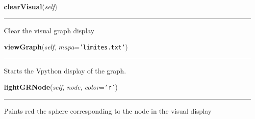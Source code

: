     \label{Epigrass:simobj:graph:clearVisual}

    \vspace{0.5ex}

    \begin{boxedminipage}{\textwidth}

    \raggedright \textbf{clearVisual}(\textit{self})

    \vspace{-1.5ex}

    \rule{\textwidth}{0.5\fboxrule}
    Clear the visual graph display

    \vspace{1ex}

    \end{boxedminipage}

    \label{Epigrass:simobj:graph:viewGraph}

    \vspace{0.5ex}

    \begin{boxedminipage}{\textwidth}

    \raggedright \textbf{viewGraph}(\textit{self}, \textit{mapa}=\texttt{'limites.txt'})

    \vspace{-1.5ex}

    \rule{\textwidth}{0.5\fboxrule}
    Starts the Vpython display of the graph.

    \vspace{1ex}

    \end{boxedminipage}

    \label{Epigrass:simobj:graph:lightGRNode}

    \vspace{0.5ex}

    \begin{boxedminipage}{\textwidth}

    \raggedright \textbf{lightGRNode}(\textit{self}, \textit{node}, \textit{color}=\texttt{'r'})

    \vspace{-1.5ex}

    \rule{\textwidth}{0.5\fboxrule}
    Paints red the sphere corresponding to the node in the visual display

    \vspace{1ex}

    \end{boxedminipage}

